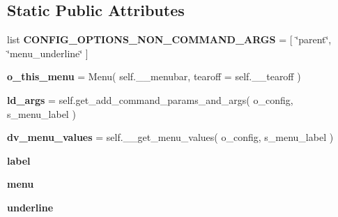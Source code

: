 \subsection*{Static Public Attributes}
\begin{DoxyCompactItemize}
\item 
list {\bfseries C\+O\+N\+F\+I\+G\+\_\+\+O\+P\+T\+I\+O\+N\+S\+\_\+\+N\+O\+N\+\_\+\+C\+O\+M\+M\+A\+N\+D\+\_\+\+A\+R\+GS} = \mbox{[} \char`\"{}parent\char`\"{}, \char`\"{}menu\+\_\+underline\char`\"{} \mbox{]}\hypertarget{classgui__frontend__popgen__program_1_1pgmenubuilder_1_1PGMenuBuilder_abebcbf4c07d8e8dbf43675e314088d5a}{}\label{classgui__frontend__popgen__program_1_1pgmenubuilder_1_1PGMenuBuilder_abebcbf4c07d8e8dbf43675e314088d5a}

\item 
{\bfseries o\+\_\+this\+\_\+menu} = Menu( self.\+\_\+\+\_\+menubar, tearoff = self.\+\_\+\+\_\+tearoff )\hypertarget{classgui__frontend__popgen__program_1_1pgmenubuilder_1_1PGMenuBuilder_abeb76d0bd440b112327fac69f10b5935}{}\label{classgui__frontend__popgen__program_1_1pgmenubuilder_1_1PGMenuBuilder_abeb76d0bd440b112327fac69f10b5935}

\item 
{\bfseries ld\+\_\+args} = self.\+get\+\_\+add\+\_\+command\+\_\+params\+\_\+and\+\_\+args( o\+\_\+config, s\+\_\+menu\+\_\+label )\hypertarget{classgui__frontend__popgen__program_1_1pgmenubuilder_1_1PGMenuBuilder_aea1757aeb44b06f9c0af5dbcb96e11f1}{}\label{classgui__frontend__popgen__program_1_1pgmenubuilder_1_1PGMenuBuilder_aea1757aeb44b06f9c0af5dbcb96e11f1}

\item 
{\bfseries dv\+\_\+menu\+\_\+values} = self.\+\_\+\+\_\+get\+\_\+menu\+\_\+values( o\+\_\+config, s\+\_\+menu\+\_\+label )\hypertarget{classgui__frontend__popgen__program_1_1pgmenubuilder_1_1PGMenuBuilder_af9a14f67b0e3ba344be2dd782dfa4b3a}{}\label{classgui__frontend__popgen__program_1_1pgmenubuilder_1_1PGMenuBuilder_af9a14f67b0e3ba344be2dd782dfa4b3a}

\item 
{\bfseries label}\hypertarget{classgui__frontend__popgen__program_1_1pgmenubuilder_1_1PGMenuBuilder_ae1be7da55a8c3709b2490344e1d393a3}{}\label{classgui__frontend__popgen__program_1_1pgmenubuilder_1_1PGMenuBuilder_ae1be7da55a8c3709b2490344e1d393a3}

\item 
{\bfseries menu}\hypertarget{classgui__frontend__popgen__program_1_1pgmenubuilder_1_1PGMenuBuilder_ab4e38859621f23a5abb5bebf2f51e466}{}\label{classgui__frontend__popgen__program_1_1pgmenubuilder_1_1PGMenuBuilder_ab4e38859621f23a5abb5bebf2f51e466}

\item 
{\bfseries underline}\hypertarget{classgui__frontend__popgen__program_1_1pgmenubuilder_1_1PGMenuBuilder_a860a087d041bb103ea6c73b93905e142}{}\label{classgui__frontend__popgen__program_1_1pgmenubuilder_1_1PGMenuBuilder_a860a087d041bb103ea6c73b93905e142}

\end{DoxyCompactItemize}


